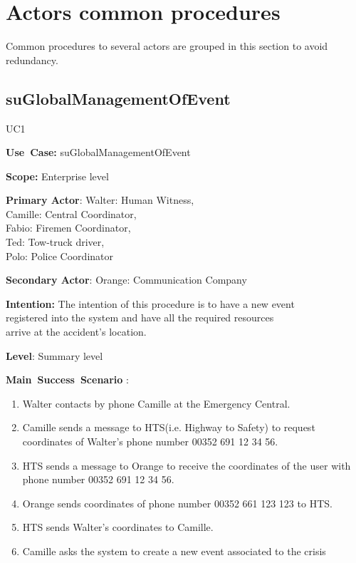 \section{Actors common procedures}
Common procedures to several actors are grouped in this section to avoid
redundancy.

\subsection{suGlobalManagementOfEvent}

\begin{lyxlist}{UC1}
\small{
\item [\textbf{Use~Case:}] suGlobalManagementOfEvent
\item [\textbf{Scope:}] Enterprise level
\item [\textbf{Primary Actor}:] Walter: Human Witness,\\ 
						        Camille: Central Coordinator,\\
								Fabio: Firemen Coordinator,\\
								Ted: Tow-truck driver,\\ 
								Polo: Police Coordinator
\item [\textbf{Secondary Actor}:] Orange: Communication Company
\item [\textbf{Intention:}] The intention of this procedure is to have a new
event\\ registered into the system and have all the required resources\\ arrive
at the accident’s location.
\item [\textbf{Level}:] Summary level
\item [\textbf{Main~Success~Scenario}]:
\begin{enumerate}
  \item Walter contacts by phone Camille at the Emergency Central.
  \item Camille sends a message to HTS(i.e. Highway to Safety) to request
  coordinates of Walter's phone number 00352 691 12 34 56.
  \item HTS sends a message to Orange to receive the coordinates of the user
  with phone number 00352 691 12 34 56.
  \item Orange sends coordinates of phone number 00352 661 123 123 to HTS.
  \item HTS sends Walter's coordinates to Camille.
  \item Camille asks the system to create a new event associated to the crisis

\end{enumerate}}
\end{lyxlist}
